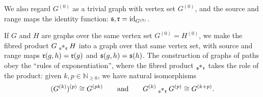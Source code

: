 We also regard $G^{(0)}$ as a trivial graph with vertex set $G^{(0)}$, and the source and range maps the identity function: $\operatorname{\mathfrak{s}},\operatorname{\mathfrak{r}}=\operatorname{id}_{G^{(0)}}$.

If $G$ and $H$ are graphs over the same vertex set $G^{(0)}=H^{(0)}$, we make the fibred product $G\tensor[_{\so}]{\ast}{_{\ra}} H$ into a graph over that same vertex set, with source and range maps $\operatorname{\mathfrak{r}}(g,h)=\operatorname{\mathfrak{r}}(g)$ and $\operatorname{\mathfrak{s}}(g,h)=\operatorname{\mathfrak{s}}(h)$.  The construction of graphs of paths obey the ``rules of exponentiation'', where the fibred product $\tensor[_{\so}]{\ast}{_{\ra}}$ takes the role of the product: given $k,p\in\mathbb{N}_{\geq 0}$, we have natural isomorphisms
\[(G^{(k)})^{(p)}\cong G^{(pk)}\qquad\text{and}\qquad G^{(k)}\tensor[_{\so}]{\ast}{_{\ra}}G^{(p)}\cong G^{(k+p)}.\]